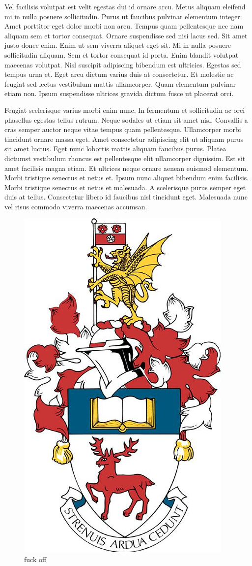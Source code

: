 Vel facilisis volutpat est velit egestas dui id ornare arcu. Metus aliquam eleifend mi in nulla posuere sollicitudin. Purus ut faucibus pulvinar elementum integer. Amet porttitor eget dolor morbi non arcu. Tempus quam pellentesque nec nam aliquam sem et tortor consequat. Ornare suspendisse sed nisi lacus sed. Sit amet justo donec enim. Enim ut sem viverra aliquet eget sit. Mi in nulla posuere sollicitudin aliquam. Sem et tortor consequat id porta. Enim blandit volutpat maecenas volutpat. Nisl suscipit adipiscing bibendum est ultricies. Egestas sed tempus urna et. Eget arcu dictum varius duis at consectetur. Et molestie ac feugiat sed lectus vestibulum mattis ullamcorper. Quam elementum pulvinar etiam non. Ipsum suspendisse ultrices gravida dictum fusce ut placerat orci.

Feugiat scelerisque varius morbi enim nunc. In fermentum et sollicitudin ac orci phasellus egestas tellus rutrum. Neque sodales ut etiam sit amet nisl. Convallis a cras semper auctor neque vitae tempus quam pellentesque. Ullamcorper morbi tincidunt ornare massa eget. Amet consectetur adipiscing elit ut aliquam purus sit amet luctus. Eget nunc lobortis mattis aliquam faucibus purus. Platea dictumst vestibulum rhoncus est pellentesque elit ullamcorper dignissim. Est sit amet facilisis magna etiam. Et ultrices neque ornare aenean euismod elementum. Morbi tristique senectus et netus et. Ipsum nunc aliquet bibendum enim facilisis. Morbi tristique senectus et netus et malesuada. A scelerisque purus semper eget duis at tellus. Consectetur libero id faucibus nisl tincidunt eget. Malesuada nunc vel risus commodo viverra maecenas accumsan.

\begin{figure}[!htbp]
    \center
    \includegraphics[width=0.3\linewidth]{images/crest.jpg}
    \caption{fuck off}
\end{figure}

